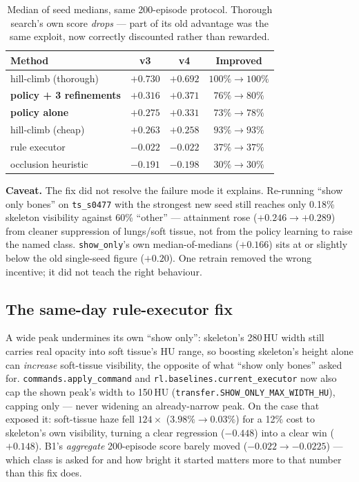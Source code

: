 \documentclass[10pt]{article}
\newcommand{\caveattext}[1]{\begin{findingbox}[colframe=black!30]\textbf{Caveat.} #1\end{findingbox}}
\newcommand{\code}[1]{\texttt{#1}}
\begin{document}
\begin{table}[h]
\centering\small
\begin{tabular}{@{}lccc@{}}
\toprule
\textbf{Method} & \textbf{v3} & \textbf{v4} & \textbf{Improved} \\
\midrule
hill-climb (thorough) & $+0.730$ & $+0.692$ & $100\% \rightarrow 100\%$ \\
\textbf{policy + 3 refinements} & $+0.316$ & $\mathbf{+0.371}$ & $76\% \rightarrow 80\%$ \\
\textbf{policy alone} & $+0.275$ & $\mathbf{+0.331}$ & $73\% \rightarrow 78\%$ \\
hill-climb (cheap) & $+0.263$ & $+0.258$ & $93\% \rightarrow 93\%$ \\
rule executor & $-0.022$ & $-0.022$ & $37\% \rightarrow 37\%$ \\
occlusion heuristic & $-0.191$ & $-0.198$ & $30\% \rightarrow 30\%$ \\
\bottomrule
\end{tabular}
\caption{Median of seed medians, same 200-episode protocol. Thorough
search's own score \emph{drops} --- part of its old advantage was the same
exploit, now correctly discounted rather than rewarded.}
\end{table}

\caveattext{The fix did not resolve the failure mode it explains. Re-running
``show only bones'' on \code{ts\_s0477} with the strongest new seed still
reaches only 0.18\% skeleton visibility against 60\% ``other'' --- attainment
rose ($+0.246 \rightarrow +0.289$) from cleaner suppression of lungs/soft
tissue, not from the policy learning to raise the named class.
\code{show\_only}'s own median-of-medians ($+0.166$) sits at or slightly
below the old single-seed figure ($+0.20$). One retrain removed the wrong
incentive; it did not teach the right behaviour.}

\subsection{The same-day rule-executor fix}
\label{sec:show-only-width}

A wide peak undermines its own ``show only'': skeleton's 280\,HU width still
carries real opacity into soft tissue's HU range, so boosting skeleton's
height alone can \emph{increase} soft-tissue visibility, the opposite of
what ``show only bones'' asked for. \code{commands.apply\_command} and
\code{rl.baselines.current\_executor} now also cap the shown peak's width to
150\,HU (\code{transfer.SHOW\_ONLY\_MAX\_WIDTH\_HU}), capping only --- never
widening an already-narrow peak. On the case that exposed it: soft-tissue
haze fell $124\times$ ($3.98\% \rightarrow 0.03\%$) for a 12\% cost to
skeleton's own visibility, turning a clear regression ($-0.448$) into a
clear win ($+0.148$). B1's \emph{aggregate} 200-episode score barely moved
($-0.022 \rightarrow -0.0225$) --- which class is asked for and how bright
it started matters more to that number than this fix does.
\end{document}
